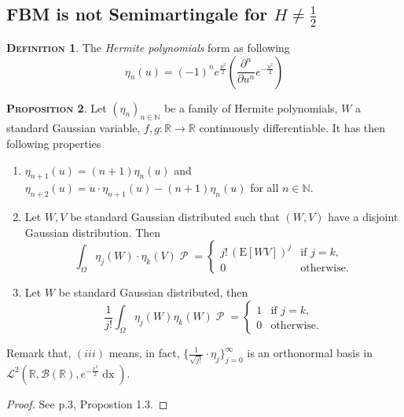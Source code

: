 \documentclass[a4paper, twoside, 11pt]{article}
\theoremstyle{definition}
\newtheorem{definition}{\scshape Definition}[section]
\newtheorem{proposition}[definition]{\scshape Proposition}
\begin{document}
\subsection{FBM is not Semimartingale for $H\neq \frac{1}{2}$}
\begin{definition}
  The \emph{Hermite polynomials} form as following
  \begin{equation}
	\eta_n(u) = (-1)^n e^{\frac{u^2}{2}} (\frac{\partial^n }{\partial u^n}e^{-\frac{u^2}{2}})
	\label{sec:hermite}
  \end{equation}
\end{definition}
\begin{proposition}
  Let $(\eta_n)_{n\in \mathbb{N}}$ be a family of Hermite polynomials, $W$ a standard Gaussian variable, $f, g: \mathbb{R}\rightarrow \mathbb{R}$ continuously differentiable. It has then following properties 
  \begin{enumerate}[topsep=0pt, itemsep=-1ex, partopsep=1ex, parsep=1ex, label=(\roman*)]
  \item $\eta_{n+1}(u)=(n+1)\eta_n(u)$ and $\eta_{n+2}(u)=u\cdot\eta_{n+1}(u) - (n+1)\eta_n(u)$ for all $n\in\mathbb{N}$.
	\item Let $W, V$ be standard Gaussian distributed such that $(W, V)$ have a disjoint Gaussian distribution. Then
	  \begin{equation*}
		\int_{\Omega} \eta_j(W)\cdot\eta_k(V) \mathop{\mathcal{P}} = \begin{cases} j!\,(\mathrm{E}[WV])^j & \mbox{if } j=k,\\
		  0 &\text{otherwise}.
		\end{cases}
	  \end{equation*}
	\item Let $W$ be standard Gaussian distributed, then
	  \begin{equation*}
		\frac{1}{j!} \int_\Omega \eta_j(W) \eta_k(W) \mathop{\mathcal{P}} = \begin{cases} 1 & \mbox{if } j=k,\\
		  0 & \text{otherwise}.
		\end{cases}
	  \end{equation*}
\end{enumerate}
Remark that, $(iii)$ means, in fact, $\{\frac{1}{\sqrt{j!}}\cdot\eta_j\}_{j=0}^{\infty}$ is an orthonormal basis in $\mathcal{L}^2(\mathbb{R}, \mathscr{B}(\mathbb{R}), e^{-\frac{x^2}{2}}\mathop{dx})$.
		\label{sec:herpro}
\end{proposition}
\begin{proof}
  See \cite{nourdin} p.3, Propostion 1.3.
\end{proof}
\end{document}
